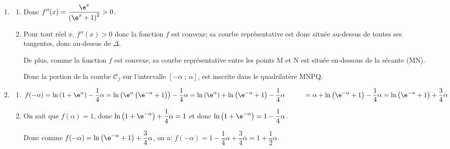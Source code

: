 \begin{enumerate}
\item 
	\begin{enumerate}
		\item %

Donc $f''(x) = \dfrac{\e^x}{\left(\e^x + 1\right)^2}>0$.

		\item%
Pour tout réel $x$, $f''(x)>0$ donc la fonction $f$ est convexe; sa courbe représentative est donc située au-dessus de toutes ses tangentes, donc au-dessus de $\Delta$.

De plus, comme la fonction $f$ est convexe, sa courbe représentative entre les points M et N est située en-dessous de la sécante (MN).

Donc  la portion de la courbe $\mathcal{C}_f$ sur l'intervalle $[-\alpha~;~\alpha]$, est inscrite dans le quadrilatère MNPQ.
	\end{enumerate}
	
\item 	
	\begin{enumerate}
		\item %
$f(-\alpha) = \ln\left (1+\e^{\alpha}\right ) -\dfrac{1}{4}\alpha
= \ln \left (\e^{\alpha} \left (\e^{-\alpha}+1\right )\right ) -\dfrac{1}{4}\alpha
= \ln\left (\e^{\alpha}\right ) + \ln \left (\e^{-\alpha}+1\right ) -\dfrac{1}{4}\alpha\\[7pt]
\phantom{f(-\alpha)}
= \alpha + \ln \left (\e^{-\alpha}+1\right ) -\dfrac{1}{4}\alpha
= \ln \left (\e^{-\alpha}+1\right )+ \dfrac{3}{4}\alpha$
		
		\item %
On sait que $f(\alpha)=1$, donc $\ln\left (1+\e^{-\alpha}\right )+\dfrac{1}{4}\alpha = 1$ et donc $\ln\left (1+\e^{-\alpha}\right ) = 1-\dfrac{1}{4}\alpha$.

Donc comme $f(-\alpha) = \ln \left (\e^{-\alpha}+1\right )+ \dfrac{3}{4}\alpha$, on a:
$f(-\alpha) = 1-\dfrac{1}{4}\alpha + \dfrac{3}{4}\alpha = 1+\dfrac{1}{2}\alpha$.



\end{enumerate}
\end{enumerate}

